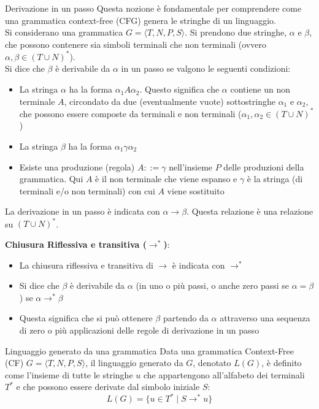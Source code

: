 \documentclass[12pt, a4paper]{report}
\begin{document}
            \begin{definitionbox}{Derivazione in un passo}{}
                Questa nozione è fondamentale per comprendere come una grammatica context-free (CFG) genera le stringhe di un linguaggio.\\
                Si considerano una grammatica $G = \langle T, N, P, S \rangle$. Si prendono due stringhe, $\alpha$ e $\beta$, che possono contenere sia simboli terminali che non terminali (ovvero $\alpha, \beta \in (T \cup N)^*$).\\
                Si dice che $\beta$ è derivabile da $\alpha$ in un passo se valgono le seguenti condizioni: \begin{itemize}
                    \item La stringa $\alpha$ ha la forma $\alpha_1 A \alpha_2$. Questo significa che $\alpha$ contiene un non terminale $A$, circondato da due (eventualmente vuote) sottostringhe $\alpha_1$ e $\alpha_2$, che possono essere composte da terminali e non terminali ($\alpha_1, \alpha_2 \in (T \cup N)^*$)
                    \item La stringa $\beta$ ha la forma $\alpha_1 \gamma \alpha_2$
                    \item Esiste una produzione (regola) $A ::= \gamma$ nell'insieme $P$ delle produzioni della grammatica. Qui $A$ è il non terminale che viene espanso e $\gamma$ è la stringa (di terminali e/o non terminali) con cui $A$ viene sostituito
                \end{itemize}
                 La derivazione in un passo è indicata con $\alpha \to \beta$. Questa relazione è una relazione su $(T \cup N)^*$.
            \end{definitionbox}
            \textbf{Chiusura Riflessiva e transitiva ($\rightarrow^*$)}: \begin{itemize}
                \item La chiusura riflessiva e transitiva di $\rightarrow$ è indicata con $\rightarrow^*$
                \item Si dice che $\beta$ è derivabile da $\alpha$ (in uno o più passi, o anche zero passi se $\alpha = \beta$) se $\alpha \rightarrow^* \beta$
                \item Questa significa che si può ottenere $\beta$ partendo da $\alpha$ attraverso una sequenza di zero o più applicazioni delle regole di derivazione in un passo
            \end{itemize}
            \begin{definitionbox}{Linguaggio generato da una grammatica}{}
                Data una grammatica Context-Free (CF) $G = \langle T, N, P, S \rangle$, il linguaggio generato da $G$, denotato $L(G)$, è definito come l'insieme di tutte le stringhe $u$ che appartengono all'alfabeto dei terminali $T^*$ e che possono essere derivate dal simbolo iniziale $S$: \begin{equation*}
                    L(G)=\{u\in T^*\mid S\to^* u\}
                \end{equation*}
            \end{definitionbox}
\end{document}
